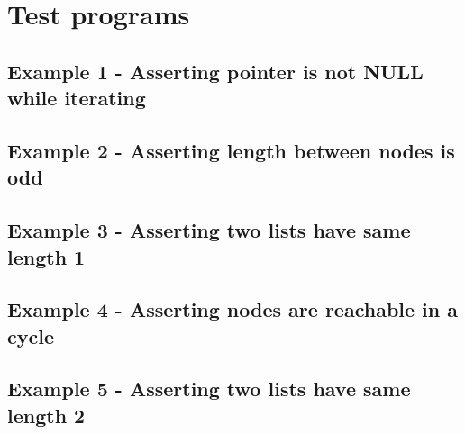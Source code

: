 \newpage
\clearpage
\section*{Test programs}
\subsection*{Example 1 - Asserting pointer is not NULL while iterating}
\newpage
\clearpage
\subsection*{Example 2 - Asserting length between nodes is odd}
\newpage
\clearpage
\subsection*{Example 3 - Asserting two lists have same length 1}
\newpage
\clearpage
\subsection*{Example 4 - Asserting nodes are reachable in a cycle}
\newpage
\clearpage
\subsection*{Example 5 - Asserting two lists have same length 2}
